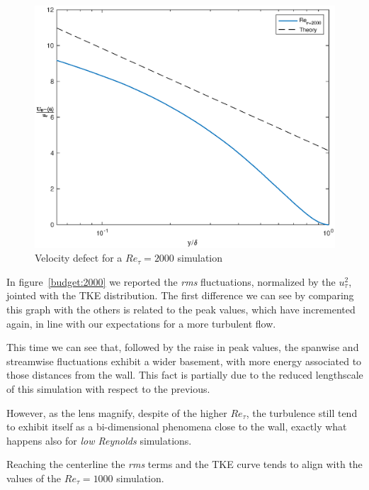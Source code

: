 \begin{figure}
\begin{center}
\includegraphics[scale=0.55]{grafici/velocity_defect_2000.eps}
\caption{Velocity defect for a $Re_{\tau}=2000$ simulation}
\label{velocity:defect:2000}
\end{center} 
\end{figure}

In figure~\ref{budget:2000} we reported the \emph{rms} fluctuations, normalized by the $u_{\tau}^{2}$, jointed with the TKE distribution. The first difference we can see by comparing this graph with the others is related to the peak values, which have incremented again, in line with our expectations for a more turbulent flow. \par
This time we can see that, followed by the raise in peak values, the spanwise and streamwise fluctuations exhibit a wider basement, with more energy   associated to those distances from the wall. This fact is partially due to the reduced lengthscale of this simulation with respect to the previous.\par
However, as the lens magnify, despite of the higher $Re_{\tau}$, the turbulence still tend to exhibit itself as a bi-dimensional phenomena close to the wall, exactly what happens also for \emph{low Reynolds} simulations.\par

Reaching the centerline the \emph{rms} terms and the TKE curve tends to align with the values of the $Re_{\tau}=1000$ simulation.\\~\par

